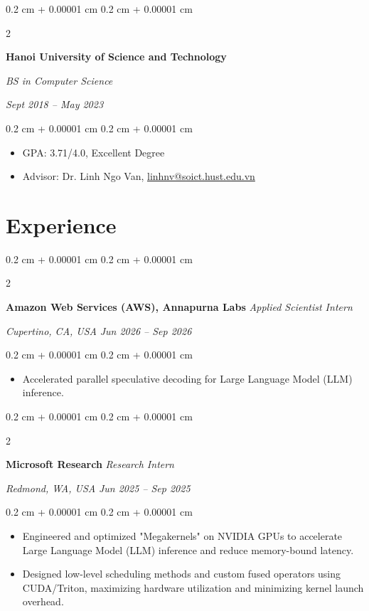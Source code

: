 \documentclass[10pt, letterpaper]{article}
\newenvironment{highlights}{
    \begin{itemize}[
        topsep=0.10 cm,
        parsep=0.10 cm,
        partopsep=0pt,
        itemsep=0pt,
        leftmargin=0.4 cm + 10pt
    ]
}{
    \end{itemize}
} %
\newenvironment{onecolentry}{
    \begin{adjustwidth}{
        0.2 cm + 0.00001 cm
    }{
        0.2 cm + 0.00001 cm
    }
}{
    \end{adjustwidth}
} %
\newenvironment{twocolentry}[2][]{
    \onecolentry
    \def\secondColumn{#2}
    \setcolumnwidth{\fill, 4.5 cm}
    \begin{paracol}{2}
}{
    \switchcolumn \raggedleft \secondColumn
    \end{paracol}
    \endonecolentry
} %
\let\hrefWithoutArrow\href
\renewcommand{\href}[2]{\hrefWithoutArrow{#1}{\ifthenelse{\equal{#2}{}}{ }{#2 }\raisebox{.15ex}{\footnotesize \faExternalLink*}}}
\begin{document}
        \vspace{0.10 cm}
        \begin{twocolentry}{

        \textit{Sept 2018 – May 2023}}
            \textbf{Hanoi University of Science and Technology}

            \textit{BS in Computer Science}
        \end{twocolentry}

        \vspace{0.10 cm}
        \begin{onecolentry}
            \begin{highlights}
                \item GPA: 3.71/4.0, Excellent Degree
                \item Advisor: Dr. Linh Ngo Van, \mbox{\hrefWithoutArrow{mailto:linhnv@soict.hust.edu.vn}{\color{black}linhnv@soict.hust.edu.vn}}
            \end{highlights}
        \end{onecolentry}

    \section{Experience}

        \begin{twocolentry}{
        \textit{Cupertino, CA, USA}
        \textit{Jun 2026 – Sep 2026}}
            \textbf{Amazon Web Services (AWS), Annapurna Labs}
            \textit{Applied Scientist Intern}
        \end{twocolentry}
        \vspace{0.10 cm}
        \begin{onecolentry}
            \begin{highlights}
                \item Accelerated parallel speculative decoding for Large Language Model (LLM) inference.
            \end{highlights}
        \end{onecolentry}

        \vspace{0.2 cm}

        \begin{twocolentry}{
        \textit{Redmond, WA, USA}
        \textit{Jun 2025 – Sep 2025}}
            \textbf{Microsoft Research}
            \textit{Research Intern}
        \end{twocolentry}
        \vspace{0.10 cm}
        \begin{onecolentry}
            \begin{highlights}
                \item Engineered and optimized "Megakernels" on NVIDIA GPUs to accelerate Large Language Model (LLM) inference and reduce memory-bound latency.
                \item Designed low-level scheduling methods and custom fused operators using CUDA/Triton, maximizing hardware utilization and minimizing kernel launch overhead.
            \end{highlights}
        \end{onecolentry}
\end{document}

